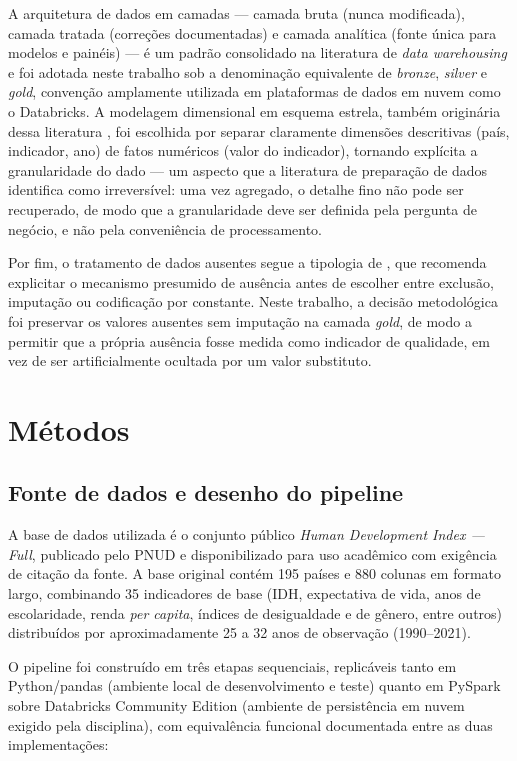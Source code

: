 \documentclass[11pt,a4paper]{article}
\begin{document}
A arquitetura de dados em camadas --- camada bruta (nunca modificada), camada tratada (correções documentadas) e camada analítica (fonte única para modelos e painéis) --- é um padrão consolidado na literatura de \textit{data warehousing} \citep{inmon2005,kimball2013} e foi adotada neste trabalho sob a denominação equivalente de \textit{bronze}, \textit{silver} e \textit{gold}, convenção amplamente utilizada em plataformas de dados em nuvem como o Databricks. A modelagem dimensional em esquema estrela, também originária dessa literatura \citep{kimball2013}, foi escolhida por separar claramente dimensões descritivas (país, indicador, ano) de fatos numéricos (valor do indicador), tornando explícita a granularidade do dado --- um aspecto que a literatura de preparação de dados identifica como irreversível: uma vez agregado, o detalhe fino não pode ser recuperado, de modo que a granularidade deve ser definida pela pergunta de negócio, e não pela conveniência de processamento.

Por fim, o tratamento de dados ausentes segue a tipologia de \citet{littlerubin2002}, que recomenda explicitar o mecanismo presumido de ausência antes de escolher entre exclusão, imputação ou codificação por constante. Neste trabalho, a decisão metodológica foi preservar os valores ausentes sem imputação na camada \textit{gold}, de modo a permitir que a própria ausência fosse medida como indicador de qualidade, em vez de ser artificialmente ocultada por um valor substituto.

\section{Métodos}

\subsection{Fonte de dados e desenho do pipeline}

A base de dados utilizada é o conjunto público \textit{Human Development Index --- Full}, publicado pelo PNUD e disponibilizado para uso acadêmico com exigência de citação da fonte. A base original contém 195 países e 880 colunas em formato largo, combinando 35 indicadores de base (IDH, expectativa de vida, anos de escolaridade, renda \textit{per capita}, índices de desigualdade e de gênero, entre outros) distribuídos por aproximadamente 25 a 32 anos de observação (1990--2021).

O pipeline foi construído em três etapas sequenciais, replicáveis tanto em Python/pandas (ambiente local de desenvolvimento e teste) quanto em PySpark sobre Databricks Community Edition (ambiente de persistência em nuvem exigido pela disciplina), com equivalência funcional documentada entre as duas implementações:
\end{document}
